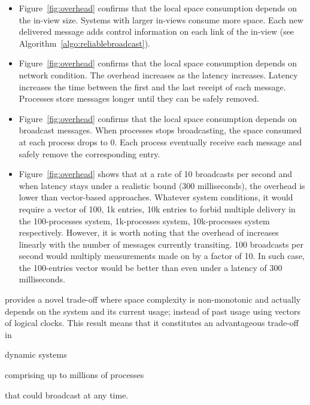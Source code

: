 \begin{itemize}
\item Figure~\ref{fig:overhead} confirms that the local space consumption
  depends on the in-view size. Systems with larger in-views consume more
  space. Each new delivered message adds control information on each link of the
  in-view (see Algorithm~\ref{algo:reliablebroadcast}).
\item Figure~\ref{fig:overhead} confirms that the local space consumption
  depends on network condition. The overhead increases as the latency
  increases. Latency increases the time between the first and the last receipt
  of each message. Processes store messages longer until they can be safely
  removed. 
\item Figure~\ref{fig:overhead} confirms that the local space consumption
  depends on broadcast messages. When processes stops broadcasting, the space
  consumed at each process drops to 0. Each process eventually receive each
  message and safely remove the corresponding entry.
\item Figure~\ref{fig:overhead} shows that at a rate of 10 broadcasts per second
  and when latency stays under a realistic bound ($300$ milliseconds), the overhead is
  lower than vector-based approaches. Whatever system conditions, it would
  require a vector of 100, 1k entries, 10k entries to forbid multiple delivery
  in the 100-processes system, 1k-processes system, 10k-processes system
  respectively. However, it is worth noting that the overhead of \RPCBROADCAST
  increases linearly with the number of messages currently transiting. 100
  broadcasts per second would multiply measurements made on \RPCBROADCAST by a
  factor of 10. In such case, the 100-entries vector would be better than
  \RPCBROADCAST even under a latency of $300$ milliseconds. 
\end{itemize}

\noindent \RPCBROADCAST provides a novel trade-off where space complexity is
non-monotonic and actually depends on the system and its current usage; instead
of past usage using vectors of logical clocks. This result means that it
constitutes an advantageous trade-off in
\begin{inparaenum}[(i)]
\item dynamic systems
\item comprising up to millions of processes
\item that could broadcast at any time.
\end{inparaenum} \\

